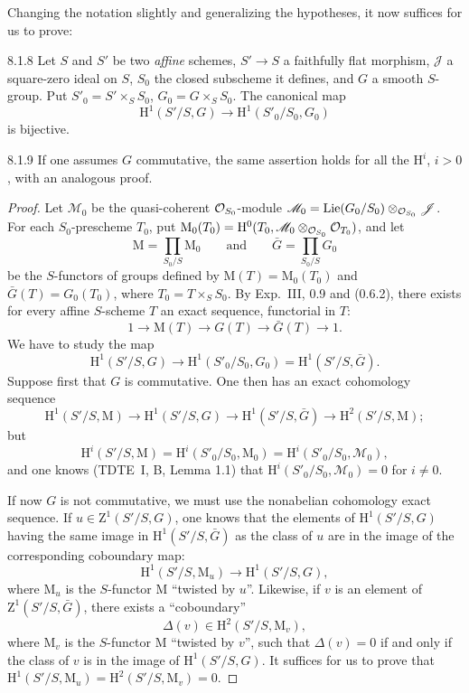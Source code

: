 Changing the notation slightly and generalizing the hypotheses, it now suffices for us to prove:
\begin{lemma}{8.1.8}\label{XXIV.8.1.8}
Let $S$ and $S'$ be two \emph{affine} schemes, $S'\to S$ a faithfully flat morphism, $\mathscr J$ a square-zero ideal on $S$, $S_0$ the closed subscheme it defines, and $G$ a smooth $S$-group. Put $S'_0=S'\times_S S_0$, $G_0=G\times_S S_0$. The canonical map
\[
\mathrm H^1(S'/S,G)\to\mathrm H^1(S'_0/S_0,G_0)
\]
is bijective.
\end{lemma}
\begin{remark}{8.1.9}\label{XXIV.8.1.9}
If one assumes $G$ commutative, the same assertion holds for all the $\mathrm H^i$, $i>0$, with an analogous proof.
\end{remark}
\begin{proof}
Let $\mathscr M_0$ be the quasi-coherent $\mathcal{O}_{S_0}$-module $\mathscr M_0=\operatorname{Lie}(G_0/S_0)\otimes_{\mathcal{O}_{S_0}}\mathscr J$. For each $S_0$-prescheme $T_0$, put $\mathrm M_0(T_0)=\mathrm H^0(T_0,\mathscr M_0\otimes_{\mathcal{O}_{S_0}}\mathcal{O}_{T_0})$, and let
\[
\mathrm M=\prod_{S_0/S}\mathrm M_0\qquad\text{and}\qquad\bar G=\prod_{S_0/S}G_0
\]
be the $S$-functors of groups defined by $\mathrm M(T)=\mathrm M_0(T_0)$ and $\bar G(T)=G_0(T_0)$, where $T_0=T\times_S S_0$. By Exp.~III, 0.9 and (0.6.2), there exists for every affine $S$-scheme $T$ an exact sequence, functorial in $T$:
\[
1\to\mathrm M(T)\to G(T)\to\bar G(T)\to1.
\]
We have to study the map
\[
\mathrm H^1(S'/S,G)\to\mathrm H^1(S'_0/S_0,G_0)=\mathrm H^1(S'/S,\bar G).
\]
Suppose first that $G$ is commutative. One then has an exact cohomology sequence
\[
\mathrm H^1(S'/S,\mathrm M)\to\mathrm H^1(S'/S,G)\to\mathrm H^1(S'/S,\bar G)\to\mathrm H^2(S'/S,\mathrm M);
\]
but
\[
\mathrm H^i(S'/S,\mathrm M)=\mathrm H^i(S'_0/S_0,\mathrm M_0)=\mathrm H^i(S'_0/S_0,\mathscr M_0),
\]
and one knows (TDTE~I, B, Lemma 1.1) that $\mathrm H^i(S'_0/S_0,\mathscr M_0)=0$ for $i\ne0$.

If now $G$ is not commutative, we must use the nonabelian cohomology exact sequence. If $u\in\mathrm Z^1(S'/S,G)$, one knows that the elements of $\mathrm H^1(S'/S,G)$ having the same image in $\mathrm H^1(S'/S,\bar G)$ as the class of $u$ are in the image of the corresponding coboundary map:
\[
\mathrm H^1(S'/S,\mathrm M_u)\to\mathrm H^1(S'/S,G),
\]
where $\mathrm M_u$ is the $S$-functor $\mathrm M$ ``twisted by $u$''. Likewise, if $v$ is an element of $\mathrm Z^1(S'/S,\bar G)$, there exists a ``coboundary''
\[
\Delta(v)\in\mathrm H^2(S'/S,\mathrm M_v),
\]
where $\mathrm M_v$ is the $S$-functor $\mathrm M$ ``twisted by $v$'', such that $\Delta(v)=0$ if and only if the class of $v$ is in the image of $\mathrm H^1(S'/S,G)$. It suffices for us to prove that $\mathrm H^1(S'/S,\mathrm M_u)=\mathrm H^2(S'/S,\mathrm M_v)=0$.


\end{proof}
